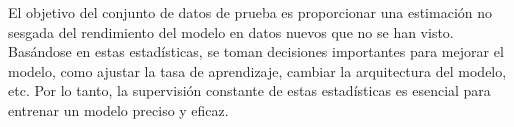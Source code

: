 \begin{enumerate}
                El objetivo del conjunto de datos de prueba es proporcionar una estimación no sesgada del rendimiento del modelo en datos nuevos que no se han visto. 
                Basándose en estas estadísticas, se toman decisiones importantes para mejorar el modelo, como ajustar la tasa de aprendizaje, cambiar la arquitectura del modelo, etc. 
                Por lo tanto, la supervisión constante de estas estadísticas es esencial para entrenar un modelo preciso y eficaz.
		\end{enumerate}

